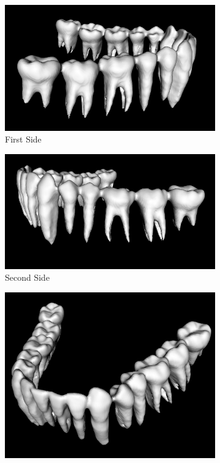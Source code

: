 \documentclass[12pt, b5paper]{article}
\begin{document}
\begin{figure}
    \centering
    \begin{subfigure}[b]{0.5\textwidth}
        \centering
        \includegraphics[width=\textwidth]{MCS2}
        \caption{First Side}
    \end{subfigure}
        \hfill
    \begin{subfigure}[b]{0.5\textwidth}
        \centering
        \includegraphics[width=\textwidth]{MCS1}
        \caption{Second Side}
    \end{subfigure}
    \hfill
    \begin{subfigure}[b]{0.5\textwidth}
        \centering
        \includegraphics[width=\textwidth]{MCF1}

\end{subfigure}
\end{figure}
\end{document}

